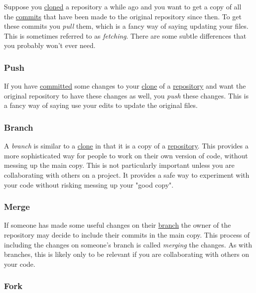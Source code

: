 \documentclass[11pt,onecolumn]{scrartcl}
\begin{document}
Suppose you \hyperref[sec:org30bf8fb]{cloned} a repository a while ago and you want to get a copy of all
the \hyperref[sec:org84683a9]{commits} that have been made to the original repository since then. To get
these commits you \emph{pull} them, which is a fancy way of saying updating your
files. This is sometimes referred to as \emph{fetching}. There are some subtle
differences that you probably won't ever need.

\subsubsection*{Push}
\label{sec:org6bea1ab}

If you have \hyperref[sec:org84683a9]{committed} some changes to your \hyperref[sec:org30bf8fb]{clone} of a \hyperref[sec:org95d76c9]{repository} and want the
original repository to have these changes as well, you \emph{push} these changes.
This is a fancy way of saying use your edits to update the original files.

\subsubsection*{Branch}
\label{sec:org6251582}

A \emph{branch} is similar to a \hyperref[sec:org30bf8fb]{clone} in that it is a copy of a \hyperref[sec:org95d76c9]{repository}. This
provides a more sophisticated way for people to work on their own version of
code, without messing up the main copy. This is not particularly important
unless you are collaborating with others on a project. It provides a safe way to
experiment with your code without risking messing up your "good copy".

\subsubsection*{Merge}
\label{sec:orgd1289e1}

If someone has made some useful changes on their \hyperref[sec:org6251582]{branch} the owner of the
repository may decide to include their commits in the main copy. This process of
including the changes on someone's branch is called \emph{merging} the changes. As
with branches, this is likely only to be relevant if you are collaborating with
others on your code.

\subsubsection*{Fork}
\label{sec:org3148517}
\end{document}
